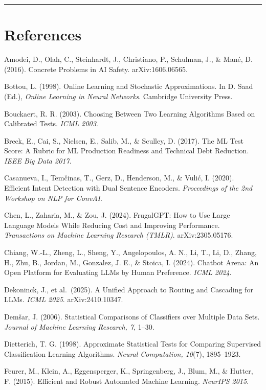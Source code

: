 \begin{center}\rule{0.5\linewidth}{0.5pt}\end{center}

\section{References}\label{references}

Amodei, D., Olah, C., Steinhardt, J., Christiano, P., Schulman, J., \&
Mané, D. (2016). Concrete Problems in AI Safety. arXiv:1606.06565.

Bottou, L. (1998). Online Learning and Stochastic Approximations. In D.
Saad (Ed.), \emph{Online Learning in Neural Networks}. Cambridge
University Press.

Bouckaert, R. R. (2003). Choosing Between Two Learning Algorithms Based
on Calibrated Tests. \emph{ICML 2003}.

Breck, E., Cai, S., Nielsen, E., Salib, M., \& Sculley, D. (2017). The
ML Test Score: A Rubric for ML Production Readiness and Technical Debt
Reduction. \emph{IEEE Big Data 2017}.

Casanueva, I., Temčinas, T., Gerz, D., Henderson, M., \& Vulić, I.
(2020). Efficient Intent Detection with Dual Sentence Encoders.
\emph{Proceedings of the 2nd Workshop on NLP for ConvAI}.

Chen, L., Zaharia, M., \& Zou, J. (2024). FrugalGPT: How to Use Large
Language Models While Reducing Cost and Improving Performance.
\emph{Transactions on Machine Learning Research (TMLR)}.
arXiv:2305.05176.

Chiang, W.-L., Zheng, L., Sheng, Y., Angelopoulos, A. N., Li, T., Li,
D., Zhang, H., Zhu, B., Jordan, M., Gonzalez, J. E., \& Stoica, I.
(2024). Chatbot Arena: An Open Platform for Evaluating LLMs by Human
Preference. \emph{ICML 2024}.

Dekoninck, J., et al.~(2025). A Unified Approach to Routing and
Cascading for LLMs. \emph{ICML 2025}. arXiv:2410.10347.

Demšar, J. (2006). Statistical Comparisons of Classifiers over Multiple
Data Sets. \emph{Journal of Machine Learning Research, 7}, 1--30.

Dietterich, T. G. (1998). Approximate Statistical Tests for Comparing
Supervised Classification Learning Algorithms. \emph{Neural Computation,
10}(7), 1895--1923.

Feurer, M., Klein, A., Eggensperger, K., Springenberg, J., Blum, M., \&
Hutter, F. (2015). Efficient and Robust Automated Machine Learning.
\emph{NeurIPS 2015}.

